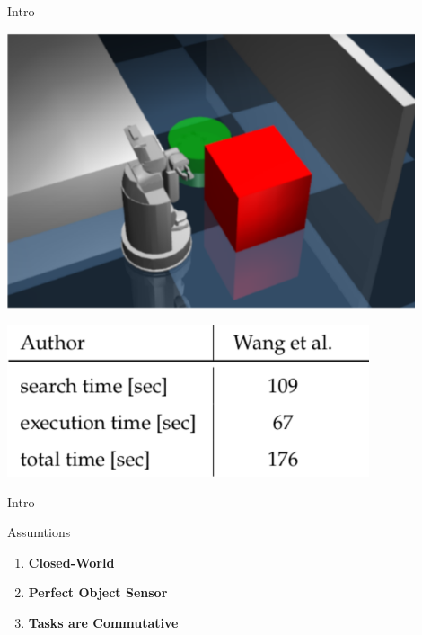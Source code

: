 \begin{frame}[fragile]{Intro}
  \begin{center}
    \vspace{-0.2cm}
  \begin{minipage}[c]{0.8\textwidth}
    \centering
    \includegraphics[width=0.9\textwidth]{figures/introduction/wang}
  \end{minipage}
  \vspace{0.3cm}
  \begin{minipage}[c]{0.5\textwidth}
     \includegraphics[width=0.8\textwidth]{figures/introduction/wang_table}
  \end{minipage}
\end{center}

\end{frame}





\begin{frame}[fragile]{Intro}
\begin{block}{Assumtions}
\begin{enumerate}
  \item \textbf{Closed-World}\pause
\item\textbf{Perfect Object Sensor}\pause
\item\textbf{Tasks are Commutative}
\end{enumerate}
\end{block}
\end{frame}
